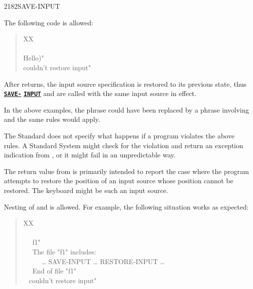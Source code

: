 \begin{worddef}{2182}{SAVE-INPUT}
\begin{rationale}
		The following code is allowed:

		\begin{quote}\ttfamily
			\word{:} XX \\
			\tab {} ~  \\
			\tab {}  Hello)"  \\
			\tab {}  couldn't restore input" \\
			\word{;}
		\end{quote}

		After  returns, the input source specification
		is restored to its previous state, thus
		\hyperref{}{core}{SAVE-INPUT}{\textbf{\texttt{SAVE-}}}
		\hyperref{}{core}{SAVE-INPUT}{\textbf{\texttt{INPUT}}}
		and  are called with the same input source
		in effect.

		In the above examples, the  phrase could have
		been replaced by a phrase involving 
		and the same rules would apply.

		The Standard does not specify what happens if a program
		violates the above rules. A Standard System might check for
		the violation and return an exception indication from
		, or it might fail in an unpredictable
		way.

		The return value from  is primarily
		intended to report the case where the program attempts to
		restore the position of an input source whose position cannot
		be restored. The keyboard might be such an input source.

		Nesting of  and  is
		allowed. For example, the following situation works as
		expected:

		\begin{quote}\ttfamily
			\word{:} XX \\
			\tab {} \\
			\tab~~  f1"  \\
			\tab~~  The file "f1" includes: \\
			\tab~~  ~~ {\ldots} SAVE-INPUT {\ldots} RESTORE-INPUT {\ldots} \\
			\tab~~  End of file "f1" \\
			\tab {} ~  couldn't restore input" \\
			\word{;}
		\end{quote}


\end{rationale}
\end{worddef}
